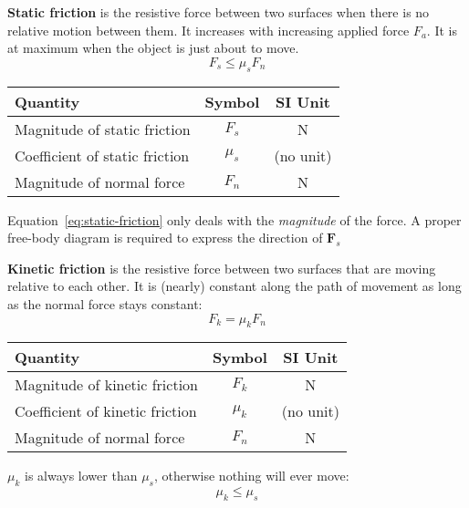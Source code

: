 \textbf{Static friction} is the resistive force between two surfaces when
there is no relative motion between them. It increases with increasing
applied force $F_a$. It is at maximum when the object is just about to move.
\begin{equation}
  \boxed{
    F_s \leq \mu_sF_n
  }
  \label{eq:static-friction}
\end{equation}
\begin{center}
  \begin{tabular}{l|c|c}
    \rowcolor{pink}
    \textbf{Quantity} & \textbf{Symbol} & \textbf{SI Unit} \\ \hline
    Magnitude of static friction   & $F_s$ & \si\newton \\
    Coefficient of static friction & $\mu_s$ & (no unit)\\
    Magnitude of normal force      & $F_n$ & \si\newton
  \end{tabular}
\end{center}
Equation~\ref{eq:static-friction} only deals with the \emph{magnitude} of the
force. A proper free-body diagram is required to express the direction of
$\bm F_s$
%      

\textbf{Kinetic friction} is the resistive force between two surfaces that
are moving relative to each other. It is (nearly) constant along the path of
movement as long as the normal force stays constant:
\begin{equation}  
  \boxed{F_k = \mu_kF_n}
\end{equation}
\begin{center}
  \begin{tabular}{l|c|c}
    \rowcolor{pink}
    \textbf{Quantity} & \textbf{Symbol} & \textbf{SI Unit} \\ \hline
    Magnitude of kinetic friction   & $F_k$   & \si{\newton}\\
    Coefficient of kinetic friction & $\mu_k$ & (no unit)\\
    Magnitude of normal force       & $F_n$   & \si{\newton}
  \end{tabular}
\end{center}    
$\mu_k$ is always lower than $\mu_s$, otherwise nothing will ever move:
\begin{equation}  
  \mu_k\leq\mu_s
\end{equation}

